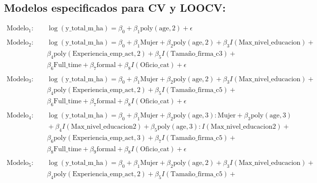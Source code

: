 \documentclass[12pt,a4paper,onecolumn]{article}
\begin{document}
\subsection{Modelos especificados para CV y LOOCV:}\label{modelos_LOOCV_anexo}
\begin{align*}
\text{Modelo}_1: & \quad \log(\text{y\_total\_m\_ha}) = \beta_0 + \beta_1 \text{poly}(\text{age}, 2) + \epsilon \\
\\
\text{Modelo}_2: & \quad \log(\text{y\_total\_m\_ha}) = \beta_0 + \beta_1 \text{Mujer} + \beta_2 \text{poly}(\text{age}, 2) + \beta_3 I(\text{Max\_nivel\_educacion}) + \\ & \quad 
\beta_4 \text{poly}(\text{Experiencia\_emp\_act}, 2) + \beta_5 I(\text{Tamaño\_firma\_c3}) + \\ & \quad 
\beta_6 \text{Full\_time} + \beta_7 \text{formal} +  \beta_8 I(\text{Oficio\_cat}) +  \epsilon \\
\\
\text{Modelo}_3: & \quad \log(\text{y\_total\_m\_ha}) = \beta_0 + \beta_1 \text{Mujer} + \beta_2 \text{poly}(\text{age}, 2) + \beta_3 I(\text{Max\_nivel\_educacion}) + \\ & \quad 
\beta_4 \text{poly}(\text{Experiencia\_emp\_act}, 2) + \beta_5 I(\text{Tamaño\_firma\_c5}) + \\ & \quad 
\beta_6 \text{Full\_time} + \beta_7 \text{formal} + \beta_8 I(\text{Oficio\_cat})+ \epsilon \\
\\
\text{Modelo}_4: & \quad \log(\text{y\_total\_m\_ha}) = \beta_0 + \beta_1 \text{Mujer} + \beta_2 \text{poly}(\text{age}, 3):\text{Mujer} + \beta_3 \text{poly}(\text{age}, 3) \\
& \quad + \beta_4 I(\text{Max\_nivel\_educacion2}) + \beta_5 \text{poly}(\text{age}, 3) : I(\text{Max\_nivel\_educacion2}) + \\
& \quad \beta_6 \text{poly}(\text{Experiencia\_emp\_act}, 3) + \beta_7 I(\text{Tamaño\_firma\_c5}) + \\
& \quad \beta_8 \text{Full\_time} + \beta_9 \text{formal} + \beta_8 I(\text{Oficio\_cat}) + \epsilon \\
\\
\text{Modelo}_5: & \quad \log(\text{y\_total\_m\_ha}) = \beta_0 + \beta_1 \text{Mujer} + \beta_2 \text{poly}(\text{age}, 2) + \beta_3 I(\text{Max\_nivel\_educacion}) + \\ & \quad 
\beta_4 \text{poly}(\text{Experiencia\_emp\_act}, 2) + \beta_5 I(\text{Tamaño\_firma\_c5}) + \\ & \quad 

\end{align*}
\end{document}
